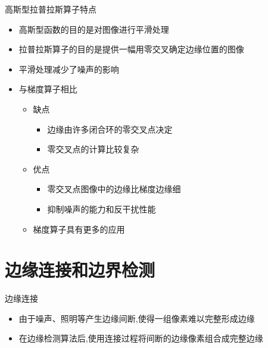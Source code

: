 \documentclass[presentation]{beamer}
\begin{document}
\begin{frame}[label={sec:org75144b9}]{高斯型拉普拉斯算子特点}
\begin{itemize}
\item 高斯型函数的目的是对图像进行平滑处理
\item 拉普拉斯算子的目的是提供一幅用零交叉确定边缘位置的图像
\item 平滑处理减少了噪声的影响
\item 与梯度算子相比
\begin{itemize}
\item 缺点
\begin{itemize}
\item 边缘由许多闭合环的零交叉点决定
\item 零交叉点的计算比较复杂
\end{itemize}
\item 优点
\begin{itemize}
\item 零交叉点图像中的边缘比梯度边缘细
\item 抑制噪声的能力和反干扰性能
\end{itemize}
\item 梯度算子具有更多的应用
\end{itemize}
\end{itemize}
\end{frame}

\section{边缘连接和边界检测}
\label{sec:org74de3b2}
\begin{frame}[label={sec:orgb45d152}]{边缘连接}
\begin{itemize}
\item 由于噪声、照明等产生边缘间断,使得一组像素难以完整形成边缘
\item 在边缘检测算法后,使用连接过程将间断的边缘像素组合成完整边缘
\end{itemize}
\end{frame}
\end{document}
